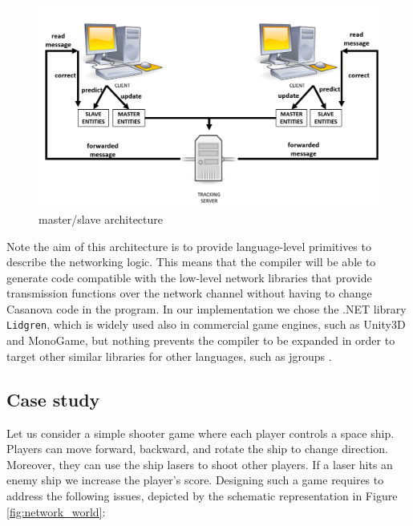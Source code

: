 \begin{figure}
	\centering
	\includegraphics[scale = 0.5]{Figures/masterslave}
	\caption{master/slave architecture}
	\label{fig:masterslave}
\end{figure}

Note the aim of this architecture is to provide language-level primitives to describe the networking logic. This means that the compiler will be able to generate code compatible with the low-level network libraries that provide transmission functions over the network channel without having to change Casanova code in the program. In our implementation we chose the .NET library \texttt{Lidgren}, which is widely used also in commercial game engines, such as Unity3D and MonoGame, but nothing prevents the compiler to be expanded in order to target other similar libraries for other languages, such as jgroups \cite{ban2002jgroups}.

\subsection{Case study}
Let us consider a simple shooter game where each player controls a space ship. Players can move forward, backward, and rotate the ship to change direction. Moreover, they can use the ship lasers to shoot other players. If a laser hits an enemy ship we increase the player's score. Designing such a game requires to address the following issues, depicted by the schematic representation in Figure \ref{fig:network_world}:

